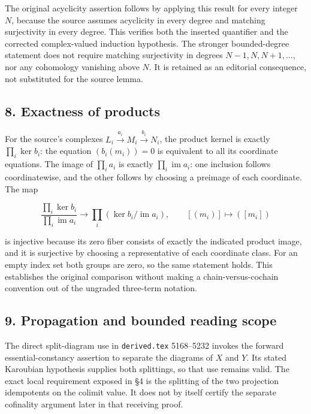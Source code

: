 \documentclass[11pt]{article}
\begin{document}
The original acyclicity assertion follows by applying this result for every integer \(N\), because the source assumes acyclicity in every degree and matching surjectivity in every degree. This verifies both the inserted quantifier and the corrected complex-valued induction hypothesis. The stronger bounded-degree statement does not require matching surjectivity in degrees \(N-1,N,N+1,\ldots\), nor any cohomology vanishing above \(N\). It is retained as an editorial consequence, not substituted for the source lemma.

\subsection{8. Exactness of products}\label{note-09-exactness-of-products}

For the source's complexes \(L_i\xrightarrow{a_i}M_i\xrightarrow{b_i}N_i\), the product kernel is exactly \(\prod_i\ker b_i\): the equation \((b_i(m_i))=0\) is equivalent to all its coordinate equations. The image of \(\prod_i a_i\) is exactly \(\prod_i\operatorname{im}a_i\): one inclusion follows coordinatewise, and the other follows by choosing a preimage of each coordinate. The map

\[
\frac{\prod_i\ker b_i}{\prod_i\operatorname{im}a_i}
\longrightarrow \prod_i(\ker b_i/\operatorname{im}a_i),
\qquad [(m_i)]\longmapsto([m_i])
\]

is injective because its zero fiber consists of exactly the indicated product image, and it is surjective by choosing a representative of each coordinate class. For an empty index set both groups are zero, so the same statement holds. This establishes the original comparison without making a chain-versus-cochain convention out of the ungraded three-term notation.

\subsection{9. Propagation and bounded reading scope}\label{note-09-propagation-and-bounded-reading-scope}

The direct split-diagram use in \texttt{derived.tex} 5168--5232 invokes the forward essential-constancy assertion to separate the diagrams of \(X\) and \(Y\). Its stated Karoubian hypothesis supplies both splittings, so that use remains valid. The exact local requirement exposed in §4 is the splitting of the two projection idempotents on the colimit value. It does not by itself certify the separate cofinality argument later in that receiving proof.
\end{document}
